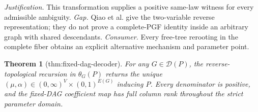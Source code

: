 \documentclass{article}
\newtheorem{theorem}{Theorem}
\begin{document}
\par\smallskip\noindent \textit{Justification.} This transformation supplies a positive same-law witness for every admissible ambiguity. \textit{Gap.} Qiao et al. give the two-variable reverse representation; they do not prove a complete-PGF identity inside an arbitrary graph with shared descendants. \textit{Consumer.} Every free-tree rerooting in the complete fiber obtains an explicit alternative mechanism and parameter point.

\begin{theorem}[thm:fixed-dag-decoder]\label{thm:fixed-dag-decoder}
For any \(G\in\mathcal D(P)\), the reverse-topological recursion in \(\theta_G(P)\) returns the unique \((\mu,\alpha)\in(0,\infty)^V\times(0,1)^{E(G)}\) inducing \(P\). Every denominator is positive, and the fixed-DAG coefficient map has full column rank throughout the strict parameter domain.
\end{theorem}
\end{document}
